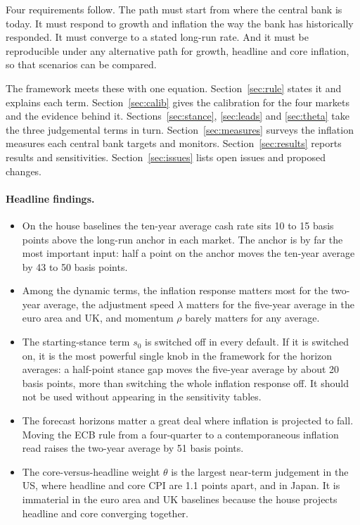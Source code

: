 \documentclass[11pt,a4paper]{article}
\begin{document}
Four requirements follow. The path must start from where the central bank is today. It must respond to growth and inflation the way the bank has historically responded. It must converge to a stated long-run rate. And it must be reproducible under any alternative path for growth, headline and core inflation, so that scenarios can be compared.

The framework meets these with one equation. Section~\ref{sec:rule} states it and explains each term. Section~\ref{sec:calib} gives the calibration for the four markets and the evidence behind it. Sections~\ref{sec:stance}, \ref{sec:leads} and \ref{sec:theta} take the three judgemental terms in turn. Section~\ref{sec:measures} surveys the inflation measures each central bank targets and monitors. Section~\ref{sec:results} reports results and sensitivities. Section~\ref{sec:issues} lists open issues and proposed changes.

\paragraph{Headline findings.}
\begin{itemize}
\item On the house baselines the ten-year average cash rate sits 10 to 15 basis points above the long-run anchor in each market. The anchor is by far the most important input: half a point on the anchor moves the ten-year average by 43 to 50 basis points.
\item Among the dynamic terms, the inflation response matters most for the two-year average, the adjustment speed $\lambda$ matters for the five-year average in the euro area and UK, and momentum $\rho$ barely matters for any average.
\item The starting-stance term $s_0$ is switched off in every default. If it is switched on, it is the most powerful single knob in the framework for the horizon averages: a half-point stance gap moves the five-year average by about 20 basis points, more than switching the whole inflation response off. It should not be used without appearing in the sensitivity tables.
\item The forecast horizons matter a great deal where inflation is projected to fall. Moving the ECB rule from a four-quarter to a contemporaneous inflation read raises the two-year average by 51 basis points.
\item The core-versus-headline weight $\theta$ is the largest near-term judgement in the US, where headline and core CPI are 1.1 points apart, and in Japan. It is immaterial in the euro area and UK baselines because the house projects headline and core converging together.
\end{itemize}
\end{document}
